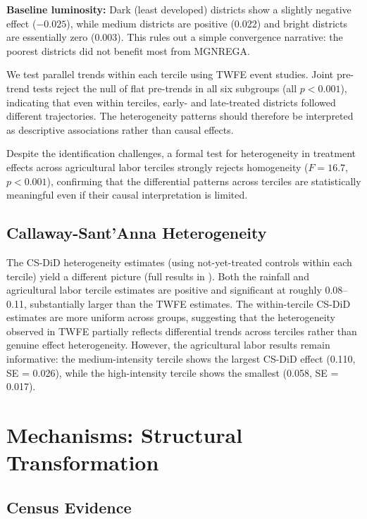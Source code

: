 \documentclass[12pt]{article}
\begin{document}
\textbf{Baseline luminosity:} Dark (least developed) districts show a slightly negative effect ($-0.025$), while medium districts are positive (0.022) and bright districts are essentially zero (0.003). This rules out a simple convergence narrative: the poorest districts did not benefit most from MGNREGA.

We test parallel trends within each tercile using TWFE event studies. Joint pre-trend tests reject the null of flat pre-trends in all six subgroups (all $p < 0.001$), indicating that even within terciles, early- and late-treated districts followed different trajectories. The heterogeneity patterns should therefore be interpreted as descriptive associations rather than causal effects.

Despite the identification challenges, a formal test for heterogeneity in treatment effects across agricultural labor terciles strongly rejects homogeneity ($F = 16.7$, $p < 0.001$), confirming that the differential patterns across terciles are statistically meaningful even if their causal interpretation is limited.

\subsection{Callaway-Sant'Anna Heterogeneity}

The CS-DiD heterogeneity estimates (using not-yet-treated controls within each tercile) yield a different picture (full results in ). Both the rainfall and agricultural labor tercile estimates are positive and significant at roughly 0.08--0.11, substantially larger than the TWFE estimates. The within-tercile CS-DiD estimates are more uniform across groups, suggesting that the heterogeneity observed in TWFE partially reflects differential trends across terciles rather than genuine effect heterogeneity. However, the agricultural labor results remain informative: the medium-intensity tercile shows the largest CS-DiD effect (0.110, SE = 0.026), while the high-intensity tercile shows the smallest (0.058, SE = 0.017).


\section{Mechanisms: Structural Transformation}

\subsection{Census Evidence}
\end{document}
